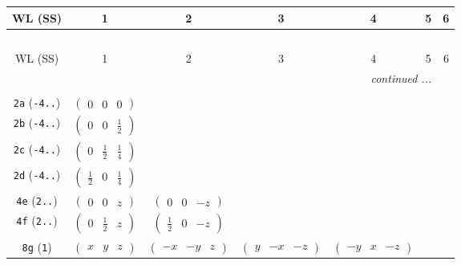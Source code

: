 \documentclass[fleqn,9pt,landscape]{jsarticle}
\begin{document}
\begin{center}
\renewcommand{\arraystretch}{1.2}
\begin{longtable}{ccccccc}
 \hline \hline
WL (SS) & 1 & 2 & 3 & 4 & 5 & 6 \\ \hline \endfirsthead

\multicolumn{6}{l}{\tablename\ \thetable{}} \\
 \hline \hline
WL (SS) & 1 & 2 & 3 & 4 & 5 & 6 \\ \hline \endhead

 \hline \hline
\multicolumn{6}{r}{\footnotesize\it continued ...} \\ \endfoot

 \hline \hline
\multicolumn{6}{r}{} \\ \endlastfoot

{\tt 2a} ({\tt -4..}) & $ \begin{pmatrix} 0 & 0 & 0 \end{pmatrix} $ & $  $ & $  $ & $  $ \\ \hline
{\tt 2b} ({\tt -4..}) & $ \begin{pmatrix} 0 & 0 & \frac{1}{2} \end{pmatrix} $ & $  $ & $  $ & $  $ \\ \hline
{\tt 2c} ({\tt -4..}) & $ \begin{pmatrix} 0 & \frac{1}{2} & \frac{1}{4} \end{pmatrix} $ & $  $ & $  $ & $  $ \\ \hline
{\tt 2d} ({\tt -4..}) & $ \begin{pmatrix} \frac{1}{2} & 0 & \frac{1}{4} \end{pmatrix} $ & $  $ & $  $ & $  $ \\ \hline
{\tt 4e} ({\tt 2..}) & $ \begin{pmatrix} 0 & 0 & z \end{pmatrix} $ & $ \begin{pmatrix} 0 & 0 & - z \end{pmatrix} $ & $  $ & $  $ \\ \hline
{\tt 4f} ({\tt 2..}) & $ \begin{pmatrix} 0 & \frac{1}{2} & z \end{pmatrix} $ & $ \begin{pmatrix} \frac{1}{2} & 0 & - z \end{pmatrix} $ & $  $ & $  $ \\ \hline
{\tt 8g} ({\tt 1}) & $ \begin{pmatrix} x & y & z \end{pmatrix} $ & $ \begin{pmatrix} - x & - y & z \end{pmatrix} $ & $ \begin{pmatrix} y & - x & - z \end{pmatrix} $ & $ \begin{pmatrix} - y & x & - z \end{pmatrix} $ \\
\end{longtable}
\end{center}
\end{document}
